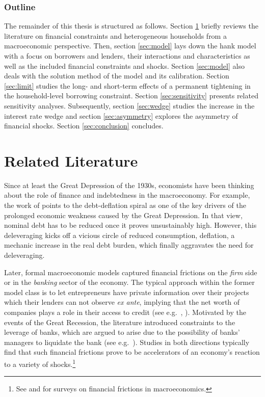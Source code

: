 \documentclass[a4paper,12pt]{article} %
\numberwithin{equation}{section} %
\numberwithin{figure}{section}
\numberwithin{table}{section}
\begin{document}
\subsubsection*{Outline}
\label{sec:outline}
The remainder of this thesis is structured as follows. Section \ref{sec:literature} briefly reviews the literature on financial constraints and heterogeneous households from a macroeconomic perspective. Then, section \ref{sec:model} lays down the \Gls{hank} model with a focus on borrowers and lenders, their interactions and characteristics as well as the included financial constraints and shocks. Section \ref{sec:model} also deals with the solution method of the model and its calibration. Section \ref{sec:limit} studies the long- and short-term effects of a permanent tightening in the household-level borrowing constraint. Section \ref{sec:sensitivity} presents related sensitivity analyses. Subsequently, section \ref{sec:wedge} studies the increase in the interest rate wedge and section \ref{sec:asymmetry} explores the asymmetry of financial shocks. Section \ref{sec:conclusion} concludes.

\section{Related Literature}
\label{sec:literature}

Since at least the Great Depression of the 1930s, economists have been thinking about the role of finance and indebtedness in the macroeconomy. For example, the work of \textcite{fisher1933} points to the debt-deflation spiral as one of the key drivers of the prolonged economic weakness caused by the Great Depression. In that view, nominal debt has to be reduced once it proves unsustainably high. However, this deleveraging kicks off a vicious circle of reduced consumption, deflation, a mechanic increase in the real debt burden, which finally aggravates the need for deleveraging.

Later, formal macroeconomic models captured financial frictions on the \textit{firm} side or in the \textit{banking} sector of the economy. The typical approach within the former model class is to let entrepreneurs have private information over their projects which their lenders can not observe \textit{ex ante}, implying that the net worth of companies plays a role in their access to credit (see e.g.~\cite{bg1989}, \cite{bgg1999}). Motivated by the events of the Great Recession, the literature introduced constraints to the leverage of banks, which are argued to arise due to the possibility of banks' managers to liquidate the bank (see e.g.~\cite{gertler2011}). Studies in both directions typically find that such financial frictions prove to be accelerators of an economy's reaction to a variety of shocks.\footnote{See \textcite{brunnermeier2012} and \textcite{christiano2022} for surveys on financial frictions in macroeconomics.}
\end{document}
